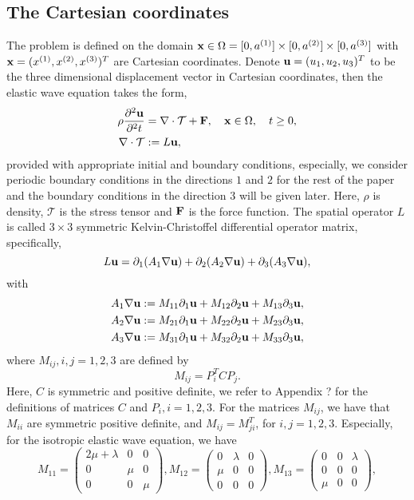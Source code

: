 \subsection{The Cartesian coordinates}
The problem is defined on the domain ${\bf x}\in\Omega = [0,a^{(1)}]\times[0,a^{(2)}]\times[0,a^{(3)}]$ with ${\bf x} = (x^{(1)},x^{(2)},x^{(3)})^T$ are Cartesian coordinates. Denote ${\bf u} = (u_1,u_2,u_3)^T$ to be the three dimensional displacement vector in Cartesian coordinates, then the elastic wave equation takes the form,
\begin{align*}
\rho\frac{\partial^2{\bf u}}{\partial^2 t} &= \nabla\cdot\mathcal{T} + {\bf F}, \ \ \ {\bf x}\in\Omega,\ \ \ t\geq 0,\\
\nabla\cdot\mathcal{T} &:= L{\bf u},
\end{align*}
provided with appropriate initial and boundary conditions, {\color{blue}especially, we consider periodic boundary conditions in the directions $1$ and $2$ for the rest of the paper and the boundary conditions in the direction $3$ will be given later}. Here, $\rho$ is density, $\mathcal{T}$ is the stress tensor and ${\bf F}$ is the force function. The spatial operator $L$ is called $3\times3$ symmetric Kelvin-Christoffel differential operator matrix, specifically,
\begin{equation*}
L{\bf  u} = \partial_1(A_1\nabla{\bf u}) + \partial_2(A_2\nabla{\bf u}) + \partial_3(A_3\nabla{\bf u}),
\end{equation*}
with
\begin{align*}
A_1\nabla{\bf u} &:= M_{11}\partial_1{\bf u} + M_{12}\partial_2{\bf u} + M_{13}\partial_3{\bf u}, \\
A_2\nabla{\bf u} &:= M_{21}\partial_1{\bf u} + M_{22}\partial_2{\bf u} + M_{23}\partial_3{\bf u}, \\
A_3\nabla{\bf u} &:= M_{31}\partial_1{\bf u} + M_{32}\partial_2{\bf u} + M_{33}\partial_3{\bf u},
\end{align*}
where $M_{ij}, i,j = 1,2,3$ are defined by
\begin{equation}\label{Mmatrices}
M_{ij} = P^T_iCP_j.
\end{equation}
Here, $C$ is symmetric and positive definite, we refer to Appendix ? for the definitions of matrices $C$ and $P_i, i = 1,2,3$. For the matrices $M_{ij}$, we have that $M_{ii}$ are symmetric positive definite, and $M_{ij}=M^T_{ji}$, for $i,j=1,2,3$. Especially, for the isotropic elastic wave equation, we have
\[ M_{11} = \left(\begin{array}{ccc}
2\mu+\lambda & 0 & 0\\
0 & \mu & 0\\
0 & 0 & \mu\end{array}\right), M_{12} = \left(\begin{array}{ccc}
0 & \lambda & 0\\
\mu & 0 & 0\\
0 & 0 & 0\end{array}\right), M_{13} = \left(\begin{array}{ccc}
0 & 0 & \lambda\\
0 & 0 & 0\\
\mu & 0 & 0\end{array}\right),\]
